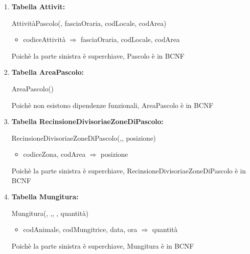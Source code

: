 \documentclass[12pt,a4paper]{article}
\begin{document}
\begin{enumerate}
\item[] \textbf{Tabella Attivit:}

AttivitàPascolo(\underline{}, fasciaOraria,  codLocale,  codArea)
\begin{itemize}
\vspace{-5pt}
\item codiceAttività $\Rightarrow$ fasciaOraria, codLocale, codArea
\vspace{-5pt}
\end{itemize}
Poichè la parte sinistra è superchiave, Pascolo è in BCNF
\vspace{10pt}



\item[] \textbf{Tabella AreaPascolo:}

AreaPascolo(\underline{})

Poichè non esistono dipendenze funzionali, AreaPascolo è in BCNF
\vspace{10pt}



\item[] \textbf{Tabella RecinsioneDivisoriaeZoneDiPascolo:}

RecinsioneDivisoriaeZoneDiPascolo(\underline{},\underline{}, posizione)
\begin{itemize}
\vspace{-5pt}
\item codiceZona, codArea $\Rightarrow$ posizione
\vspace{-5pt}
\end{itemize}
Poichè la parte sinistra è superchiave, RecinsioneDivisoriaeZoneDiPascolo è in BCNF
\vspace{10pt}



\item[] \textbf{Tabella Mungitura:}

Mungitura(\underline{}, \underline{},\underline{}, \underline{}, quantità)
\begin{itemize}
\vspace{-5pt}
\item codAnimale, codMungitrice, data, ora $\Rightarrow$ quantità
\vspace{-5pt}
\end{itemize}
Poichè la parte sinistra è superchiave, Mungitura è in BCNF
\vspace{10pt}




\end{enumerate}
\end{document}

